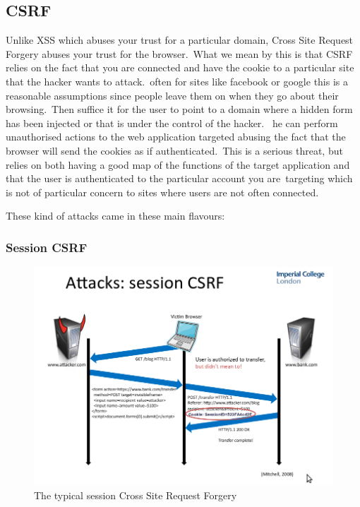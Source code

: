 \subsection{CSRF}
\label{subsec:crsf}

Unlike XSS which abuses your trust for a particular domain, Cross Site Request Forgery abuses your trust for the browser.\
What we mean by this is that CSRF relies on the fact that you are connected and have the cookie to a particular site that the hacker wants to attack.\
often for sites like facebook or google this is a reasonable assumptions since people leave them on when they go about their browsing.\ Then suffice it for the user
to point to a domain where a hidden form has been injected or that is under the control of the hacker. \
he can perform unauthorised actions to the web application targeted abusing the fact that the browser will send the cookies as if authenticated.\
This is a serious threat, but relies on both having a good map of the functions of the target application and that the user is authenticated to the particular account you are\
targeting which is not of particular concern to sites where users are not often connected.\

These kind of attacks came in these main flavours:

\subsubsection{Session CSRF}

\begin{figure}
\centering
\includegraphics[width=1\textwidth]{./sessioncsrf.png}
\caption{\label{fig:sessioncsrf}The typical session Cross Site Request Forgery}	
\end{figure}



